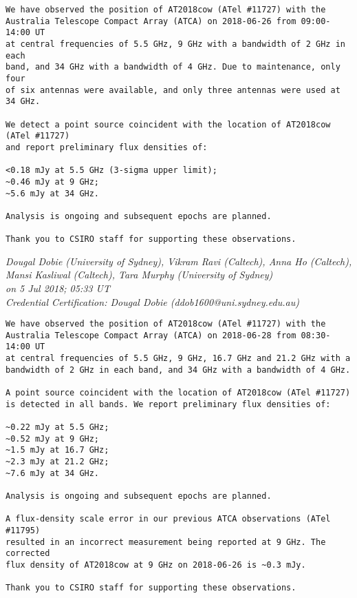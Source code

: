 \begin{verbatim}
We have observed the position of AT2018cow (ATel #11727) with the
Australia Telescope Compact Array (ATCA) on 2018-06-26 from 09:00-14:00 UT
at central frequencies of 5.5 GHz, 9 GHz with a bandwidth of 2 GHz in each
band, and 34 GHz with a bandwidth of 4 GHz. Due to maintenance, only four
of six antennas were available, and only three antennas were used at 34 GHz.

We detect a point source coincident with the location of AT2018cow (ATel #11727)
and report preliminary flux densities of:

<0.18 mJy at 5.5 GHz (3-sigma upper limit);
~0.46 mJy at 9 GHz;
~5.6 mJy at 34 GHz.

Analysis is ongoing and subsequent epochs are planned.

Thank you to CSIRO staff for supporting these observations.
\end{verbatim}

\begin{center}
\textit{ Dougal Dobie (University of Sydney), Vikram Ravi (Caltech), Anna Ho (Caltech),\\
Mansi Kasliwal (Caltech), Tara Murphy (University of Sydney)\\
on 5 Jul 2018; 05:33 UT\\
Credential Certification: Dougal Dobie (ddob1600@uni.sydney.edu.au)}
\end{center}
\begin{verbatim}
We have observed the position of AT2018cow (ATel #11727) with the
Australia Telescope Compact Array (ATCA) on 2018-06-28 from 08:30-14:00 UT
at central frequencies of 5.5 GHz, 9 GHz, 16.7 GHz and 21.2 GHz with a
bandwidth of 2 GHz in each band, and 34 GHz with a bandwidth of 4 GHz.

A point source coincident with the location of AT2018cow (ATel #11727)
is detected in all bands. We report preliminary flux densities of:

~0.22 mJy at 5.5 GHz;
~0.52 mJy at 9 GHz;
~1.5 mJy at 16.7 GHz;
~2.3 mJy at 21.2 GHz;
~7.6 mJy at 34 GHz.

Analysis is ongoing and subsequent epochs are planned.

A flux-density scale error in our previous ATCA observations (ATel #11795)
resulted in an incorrect measurement being reported at 9 GHz. The corrected
flux density of AT2018cow at 9 GHz on 2018-06-26 is ~0.3 mJy.

Thank you to CSIRO staff for supporting these observations.
\end{verbatim}

